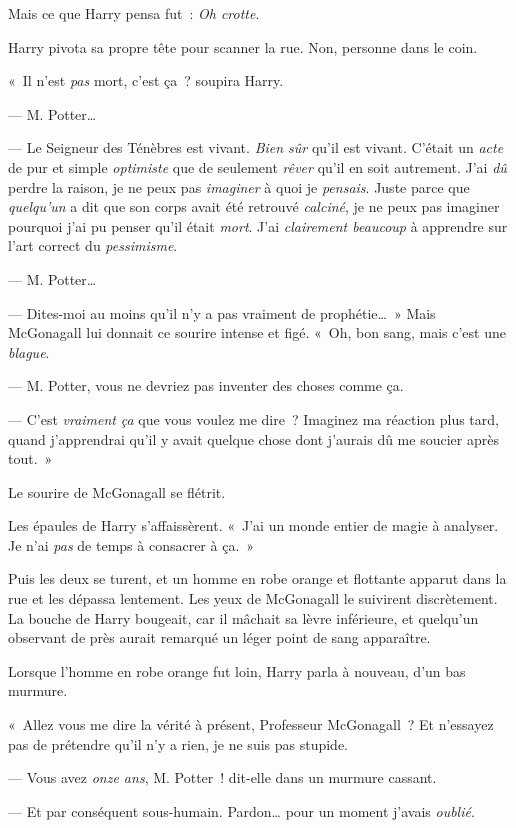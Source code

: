 Mais ce que Harry pensa fut~: \emph{Oh crotte}.

Harry pivota sa propre tête pour scanner la rue. Non, personne dans le coin.

«~Il n'est \emph{pas} mort, c'est ça~? soupira Harry.

--- M. Potter…

--- Le Seigneur des Ténèbres est vivant. \emph{Bien sûr} qu'il est vivant. C'était un \emph{acte} de pur et simple \emph{optimiste} que de seulement \emph{rêver} qu'il en soit autrement. J'ai \emph{dû} perdre la raison, je ne peux pas \emph{imaginer} à quoi je \emph{pensais}. Juste parce que \emph{quelqu'un} a dit que son corps avait été retrouvé \emph{calciné}, je ne peux pas imaginer pourquoi j'ai pu penser qu'il était \emph{mort}. J'ai \emph{clairement beaucoup} à apprendre sur l'art correct du \emph{pessimisme}.

--- M. Potter…

--- Dites-moi au moins qu'il n'y a pas vraiment de prophétie…~» Mais McGonagall lui donnait ce sourire intense et figé. «~Oh, bon sang, mais c'est une \emph{blague}.

--- M. Potter, vous ne devriez pas inventer des choses comme ça.

--- C'est \emph{vraiment} \emph{ça} que vous voulez me dire~? Imaginez ma réaction plus tard, quand j'apprendrai qu'il y avait quelque chose dont j'aurais dû me soucier après tout.~»

Le sourire de McGonagall se flétrit.

Les épaules de Harry s'affaissèrent. «~J'ai un monde entier de magie à analyser. Je n'ai \emph{pas} de temps à consacrer à ça.~»

Puis les deux se turent, et un homme en robe orange et flottante apparut dans la rue et les dépassa lentement. Les yeux de McGonagall le suivirent discrètement. La bouche de Harry bougeait, car il mâchait sa lèvre inférieure, et quelqu'un observant de près aurait remarqué un léger point de sang apparaître.

Lorsque l'homme en robe orange fut loin, Harry parla à nouveau, d'un bas murmure.

«~Allez vous me dire la vérité à présent, Professeur McGonagall~? Et n'essayez pas de prétendre qu'il n'y a rien, je ne suis pas stupide.

--- Vous avez \emph{onze ans}, M. Potter~! dit-elle dans un murmure cassant.

--- Et par conséquent sous-humain. Pardon… pour un moment j'avais \emph{oublié}.

